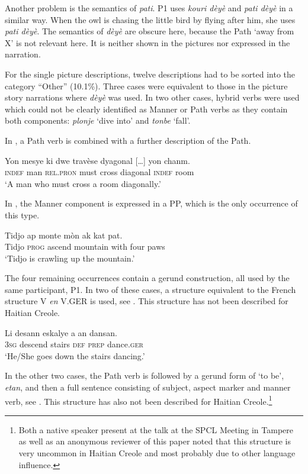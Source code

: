 \documentclass[output=paper,colorlinks,citecolor=brown]{langscibook}
\begin{document}
Another problem is the semantics of \emph{pati}. P1 uses \emph{kouri dèyè} and \emph{pati dèyè} in a similar way. When the owl is chasing the little bird by flying after him, she uses \emph{pati dèyè}. The semantics of \emph{dèyè} are obscure here, because the Path ‘away from X’ is not relevant here. It is neither shown in the pictures nor expressed in the narration.

For the single picture descriptions, twelve descriptions had to be sorted into the category “Other” (10.1\%). Three cases were equivalent to those in the picture story narrations where \emph{dèyè} was used. In two other cases, hybrid verbs were used which could not be clearly identified as Manner or Path verbs as they contain both components: \emph{plonje} ‘dive into’ and \emph{tonbe} ‘fall’.

In , a Path verb is combined with a further description of the Path.

\ea\label{ex:3:72}
\gll Yon mesye ki dwe travèse dyagonal {[}…{]} yon chanm.\\
     \textsc{indef} man \textsc{rel.pron} must cross diagonal {} \textsc{indef} room \\
\glt ‘A man who must cross a room diagonally.’
\z

In , the Manner component is expressed in a PP, which is the only occurrence of this type.

\ea\label{ex:3:73}
\gll Tidjo ap monte mòn ak kat pat.\\
     Tidjo \textsc{prog} ascend mountain with four paws\\
\glt ‘Tidjo is crawling up the mountain.’
\z

The four remaining occurrences contain a gerund construction, all used by the same participant, P1. In two of these cases, a structure equivalent to the French structure V \emph{en} V.GER is used, see . This structure has not been described for Haitian Creole.

\ea\label{ex:3:74}
\gll Li desann eskalye a an dansan. \\
     \textsc{3sg} descend stairs \textsc{def} \textsc{prep} dance.\textsc{ger}\\
\glt ‘He/She goes down the stairs dancing.’
\z

In the other two cases, the Path verb is followed by a gerund form of `to be', \emph{etan}, and then a full sentence consisting of subject, aspect marker and manner verb, see . This structure has also not been described for Haitian Creole.\footnote{Both a native speaker present at the talk at the SPCL Meeting in Tampere as well as an anonymous reviewer of this
paper noted that this structure is very uncommon in Haitian Creole and most probably due to other language influence.} 
\end{document}
